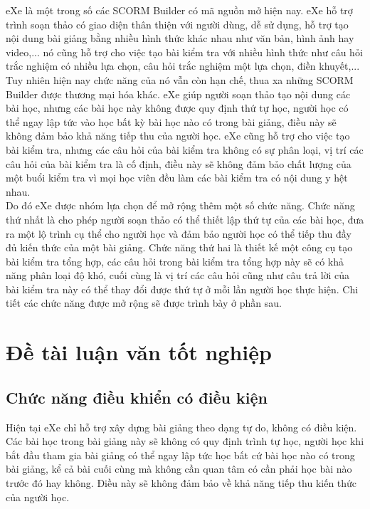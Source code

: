 	
	eXe là một trong số các SCORM Builder có mã nguồn mở hiện nay. eXe hỗ trợ trình soạn thảo có giao diện thân thiện với người dùng, dễ sử dụng, hỗ trợ tạo nội dung bài giảng bằng nhiều hình thức khác nhau như văn bản, hình ảnh hay video,... nó cũng hỗ trợ cho việc tạo bài kiểm tra với nhiều hình thức như câu hỏi trắc nghiệm có nhiều lựa chọn, câu hỏi trắc nghiệm một lựa chọn, điền khuyết,... Tuy nhiên hiện nay chức năng của nó vẫn còn hạn chế, thua xa những SCORM Builder được thương mại hóa khác. eXe giúp người soạn thảo tạo nội dung các bài học, nhưng các bài học này không được quy định thứ tự học, người học có thể ngay lập tức vào học bất kỳ bài học nào có trong bài giảng, điều này sẽ không đảm bảo khả năng tiếp thu của người học. eXe cũng hỗ trợ cho việc tạo bài kiểm tra, nhưng các câu hỏi của bài kiểm tra không có sự phân loại, vị trí các câu hỏi của bài kiểm tra là cố định, điều này sẽ không đảm bảo chất lượng của một buổi kiểm tra vì mọi học viên đều làm các bài kiểm tra có nội dung y hệt nhau.\\
	
	Do đó eXe được nhóm lựa chọn để mở rộng thêm một số chức năng. Chức năng thứ nhất là cho phép người soạn thảo có thể thiết lập thứ tự của các bài học, đưa ra một lộ trình cụ thể cho người học và đảm bảo người học có thể tiếp thu đầy đủ kiến thức của một bài giảng. Chức năng thứ hai là thiết kế một công cụ tạo bài kiểm tra tổng hợp, các câu hỏi trong bài kiểm tra tổng hợp này sẽ có khả năng phân loại độ khó, cuối cùng là vị trí các câu hỏi cũng như câu trả lời của bài kiểm tra này có thể thay đổi được thứ tự ở mỗi lần người học thực hiện. Chi tiết các chức năng được mở rộng sẽ được trình bày ở phần sau.
	
\section{Đề tài luận văn tốt nghiệp}
\subsection{Chức năng điều khiển có điều kiện}

	Hiện tại eXe chỉ hỗ trợ xây dựng bài giảng theo dạng tự do, không có điều kiện. Các bài học trong bài giảng này sẽ không có quy định trình tự học, người học khi bắt đầu tham gia bài giảng có thể ngay lập tức học bất cứ bài học nào có trong bài giảng, kể cả bài cuối cùng mà không cần quan tâm có cần phải học bài nào trước đó hay không. Điều này sẽ không đảm bảo về khả năng tiếp thu kiến thức của người học.
	
